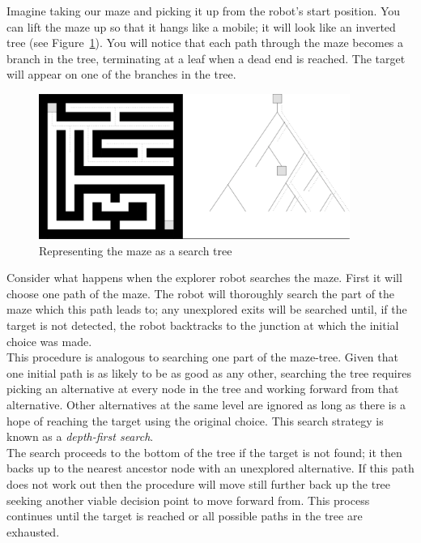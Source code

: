 \noindent
Imagine taking our maze and picking it up from the robot's start position.
You can lift the maze up so that it hangs like a mobile; it will look
like an inverted tree (see Figure~\ref{mobile}). You will notice that each path through
the maze becomes a branch in the tree, terminating at a leaf when a
dead end is reached. The target will appear on one of the branches in the
tree.\\

\begin{figure}
\centering
\includegraphics[width=4in]{mobile.pdf}
\caption{Representing the maze as a search tree \label{mobile}}
\end{figure}

\noindent
Consider what happens when the explorer robot searches the maze. First it
will choose one path of the maze. The robot will thoroughly search the part
of the maze which this path leads to; any unexplored exits will be
searched until, if the target is not detected, the robot backtracks to the
junction at which the initial choice was made.\\

\noindent
This procedure is analogous to searching one part of the maze-tree. Given
that one initial path is as likely to be as good as any other, searching
the tree requires picking an alternative at every node in the tree and
working forward from that alternative. Other alternatives at the same
level are ignored as long as there is a hope of reaching the
target using the original choice. This search strategy is known as
a {\it depth-first search}.\\

\noindent
The search proceeds to the bottom of the tree if the target is not found;
it then backs up to the nearest ancestor node with an unexplored alternative.
If this path does not work out then the procedure will move still further
back up the tree seeking another viable decision point to move forward from.
This process continues until the target is reached or all possible paths in
the tree are exhausted. \\

